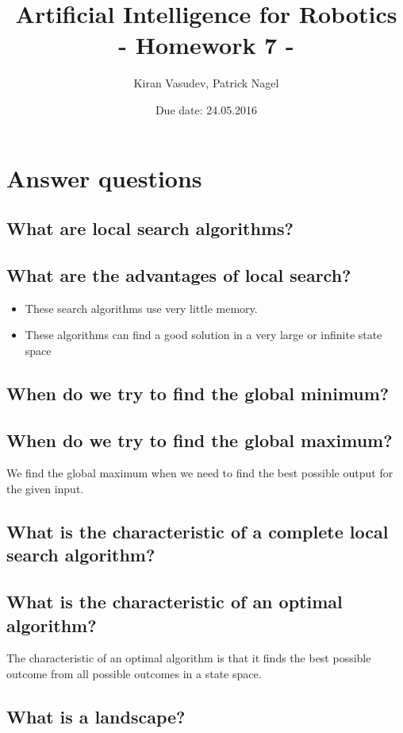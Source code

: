 \documentclass[11pt]{article}
\title{\textbf{Artificial Intelligence for Robotics\\ - Homework 7 -}}
\author{Kiran Vasudev, Patrick Nagel}
\date{Due date: 24.05.2016}
\begin{document}
\maketitle

\newpage
\tableofcontents

\newpage
\section{Answer questions}
\subsection{What are local search algorithms?}

\subsection{What are the advantages of local search?}
\begin{itemize}
\item {These search algorithms use very little memory.}
\item {These algorithms can find a good solution in a very large or infinite state space}
\end{itemize}

\subsection{When do we try to find the global minimum?}

\subsection{When do we try to find the global maximum?}
We find the global maximum when we need to find the best possible output for the given input.

\subsection{What is the characteristic of a complete local search algorithm?}

\subsection{What is the characteristic of an optimal algorithm?}
The characteristic of an optimal algorithm is that it finds the best possible outcome from all possible outcomes in a state space.

\subsection{What is a landscape?}
\end{document}
